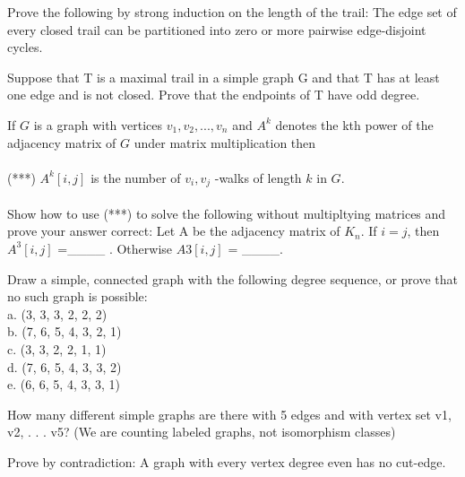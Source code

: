 \documentclass[12pt]{article}
\newenvironment{question}[2][Question]{\begin{trivlist}
\item[\hskip \labelsep {\bfseries #1}\hskip \labelsep {\bfseries #2.}]}{\end{trivlist}}
\begin{document}
\begin{question}{3}
Prove the following by strong induction on the length of the trail: The edge set of every closed
trail can be partitioned into zero or more pairwise edge-disjoint cycles.
\end{question}

\begin{question}{4}
Suppose that T is a maximal trail in a simple graph G and that T has at least one edge and is
not closed. Prove that the endpoints of T have odd degree.
\end{question}

\begin{question}{5}
If $G$ is a graph with vertices $v_1, v_2, . . . , v_n$ and $A^k$ denotes the kth power of the adjacency matrix
of $G$ under matrix multiplication then \\ \\

(***) $A^{k}[i, j]$ is the number of $v_i, v_j$ -walks of length $k$ in $G$. \\ \\

Show how to use (***) to solve the following without multipltying matrices and prove your answer
correct: Let A be the adjacency matrix of $K_n$. If $i = j$, then $A^3[i, j]$ =\_\_\_\_ . Otherwise
$A3[i, j]$ = \_\_\_\_.
\end{question}

\begin{question}{6}
Draw a simple, connected graph with the following degree sequence, or prove that no such graph
is possible: \\
a. (3, 3, 3, 2, 2, 2) \\
b. (7, 6, 5, 4, 3, 2, 1) \\ 
c. (3, 3, 2, 2, 1, 1) \\
d. (7, 6, 5, 4, 3, 3, 2) \\
e. (6, 6, 5, 4, 3, 3, 1) 
\end{question}

\begin{question}{7}
 How many different simple graphs are there with 5 edges and with vertex set {v1, v2, . . . v5}?
(We are counting labeled graphs, not isomorphism classes)
\end{question}

\begin{question}{8}
Prove by contradiction: A graph with every vertex degree even has no cut-edge.
\end{question}




\end{document}
